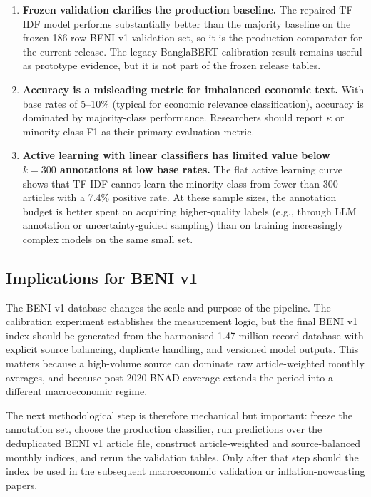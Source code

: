 \begin{enumerate}
    \item \textbf{Frozen validation clarifies the production baseline.} The repaired TF-IDF model performs substantially better than the majority baseline on the frozen 186-row BENI v1 validation set, so it is the production comparator for the current release. The legacy BanglaBERT calibration result remains useful as prototype evidence, but it is not part of the frozen release tables.
    \item \textbf{Accuracy is a misleading metric for imbalanced economic text.} With base rates of 5--10\% (typical for economic relevance classification), accuracy is dominated by majority-class performance. Researchers should report $\kappa$ or minority-class F1 as their primary evaluation metric.
    \item \textbf{Active learning with linear classifiers has limited value below $k = 300$ annotations at low base rates.} The flat active learning curve shows that TF-IDF cannot learn the minority class from fewer than 300 articles with a 7.4\% positive rate. At these sample sizes, the annotation budget is better spent on acquiring higher-quality labels (e.g., through LLM annotation or uncertainty-guided sampling) than on training increasingly complex models on the same small set.
\end{enumerate}

\subsection{Implications for BENI v1}

The BENI v1 database changes the scale and purpose of the pipeline. The calibration experiment establishes the measurement logic, but the final BENI v1 index should be generated from the harmonised 1.47-million-record database with explicit source balancing, duplicate handling, and versioned model outputs. This matters because a high-volume source can dominate raw article-weighted monthly averages, and because post-2020 BNAD coverage extends the period into a different macroeconomic regime.

The next methodological step is therefore mechanical but important: freeze the annotation set, choose the production classifier, run predictions over the deduplicated BENI v1 article file, construct article-weighted and source-balanced monthly indices, and rerun the validation tables. Only after that step should the index be used in the subsequent macroeconomic validation or inflation-nowcasting papers.
